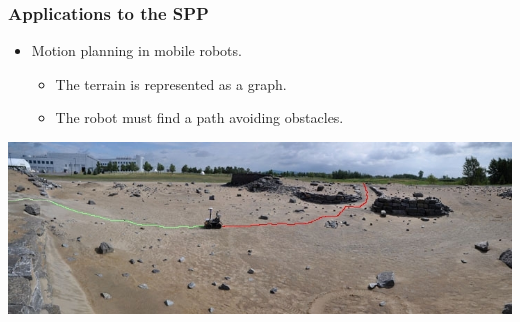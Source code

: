 \begin{frame}[t] 
\frametitle{Applications to the SPP}
  \begin{itemize}
  \item Motion planning in mobile robots.
  \vspace{2mm}
  \begin{itemize}
  		\item The terrain is represented as a graph.
  		\vspace{2mm}
  		\item The robot must find a path avoiding obstacles.
  	\end{itemize}
  \end{itemize}
  \vspace{4mm}  
  \begin{center}
    \includegraphics[scale=0.5]{figs/robot}
  \end{center}
\end{frame}
